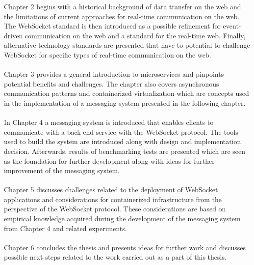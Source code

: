 Chapter 2 begins with a historical background of data transfer on the web and the limitations of current approaches for real-time communication on the web. The WebSocket standard is then introduced as a possible refinement for event-driven communication on the web and a standard for the real-time web. Finally, alternative technology standards are presented that have to potential to challenge WebSocket for specific types of real-time communication on the web.
\\ \\
Chapter 3 provides a general introduction to microservices and pinpoints potential benefits and challenges. The chapter also covers asynchronous communication patterns and containerized virtualization which are concepts used in the implementation of a messaging system presented in the following chapter.
\\ \\
In Chapter 4 a messaging system is introduced that enables clients to communicate with a back end service with the WebSocket protocol. The tools used to build the system are introduced along with design and implementation decision. Afterwards, results of benchmarking tests are presented which are seen as the foundation for further development along with ideas for further improvement of the messaging system.
\\ \\
Chapter 5 discusses challenges related to the deployment of WebSocket applications and considerations for containerized infrastructure from the perspective of the WebSocket protocol. These considerations are based on empirical knowledge acquired during the development of the messaging system from Chapter 4 and related experiments.
\\ \\
Chapter 6 concludes the thesis and presents ideas for further work and discusses possible next steps related to the work carried out as a part of this thesis.